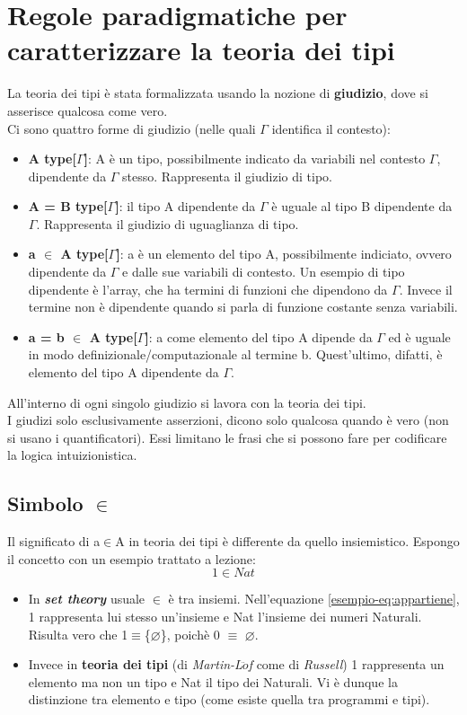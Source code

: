 \documentclass[10pt,a4paper, italian]{book}
\begin{document}
\section{Regole paradigmatiche per caratterizzare la teoria dei tipi}
\label{sec:prime-regole-teoria-dei-tipi}
La teoria dei tipi \`e stata formalizzata usando la nozione di \textbf{giudizio}, dove si asserisce qualcosa come vero.\\
Ci sono quattro forme di giudizio (nelle quali $\Gamma$ identifica il contesto):
\begin{itemize}
\item \textbf{A type[$\Gamma$]}: A \`e un tipo, possibilmente indicato da variabili nel contesto $\Gamma$, dipendente da $\Gamma$ stesso. Rappresenta il giudizio di tipo.
\item \textbf{A = B type[$\Gamma$]}: il tipo A dipendente da $\Gamma$ \`e uguale al tipo B dipendente da $\Gamma$. Rappresenta il giudizio di uguaglianza di tipo.
\item \textbf{a $\in$ A type[$\Gamma$]}: a \`e un elemento del tipo A, possibilmente indiciato, ovvero dipendente da $\Gamma$ e dalle sue variabili di contesto. Un esempio di tipo dipendente \`e l'array, che ha termini di funzioni che dipendono da $\Gamma$. Invece il termine non \`e dipendente quando si parla di funzione costante senza variabili.
\item \textbf{a = b $\in$ A type[$\Gamma$]}: a come elemento del tipo A dipende da $\Gamma$ ed \`e uguale in modo definizionale/computazionale al termine b. Quest'ultimo, difatti, \`e elemento del tipo A dipendente da $\Gamma$.
\end{itemize}
\noindent
All'interno di ogni singolo giudizio si lavora con la teoria dei tipi.\\
I giudizi solo esclusivamente asserzioni, dicono solo qualcosa quando \`e vero (non si usano i quantificatori). Essi limitano le frasi che si possono fare per codificare la logica intuizionistica. 
\subsection{Simbolo $\in$}
\label{subsec:simbolo-appartiene}
Il significato di a$\in$A in teoria dei tipi \`e differente da quello insiemistico. Espongo il concetto con un esempio trattato a lezione:
\begin{equation}
1 \in Nat \label{esempio-eq:appartiene}
\end{equation}


\begin{itemize}
\item In \textbf{\textit{set theory}} usuale $\in$ \`e tra insiemi. Nell'equazione \ref{esempio-eq:appartiene}, 1 rappresenta lui stesso un'insieme e Nat l'insieme dei numeri Naturali.
Risulta vero che 1$\equiv$\{$\varnothing$\}, poich\`e 0 $\equiv$ $\varnothing$.
\item Invece in \textbf{teoria dei tipi} (di \textit{Martin-L$\ddot{o}$f} come di \textit{Russell})
1 rappresenta un elemento ma non un tipo e Nat il tipo dei Naturali. Vi \`e dunque la distinzione tra elemento e tipo (come esiste quella tra programmi e tipi).
\end{itemize}
\end{document}
